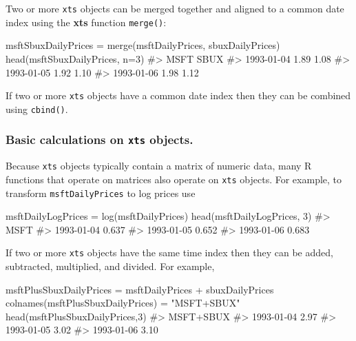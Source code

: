 \documentclass[
  letterpaper,
  DIV=11,
  numbers=noendperiod]{scrreprt}
\newenvironment{Shaded}{\begin{snugshade}}{\end{snugshade}}
\newcommand{\AttributeTok}[1]{\textcolor[rgb]{0.40,0.45,0.13}{#1}}
\newcommand{\CommentTok}[1]{\textcolor[rgb]{0.37,0.37,0.37}{#1}}
\newcommand{\DecValTok}[1]{\textcolor[rgb]{0.68,0.00,0.00}{#1}}
\newcommand{\FunctionTok}[1]{\textcolor[rgb]{0.28,0.35,0.67}{#1}}
\newcommand{\NormalTok}[1]{\textcolor[rgb]{0.00,0.23,0.31}{#1}}
\newcommand{\OtherTok}[1]{\textcolor[rgb]{0.00,0.23,0.31}{#1}}
\newcommand{\SpecialCharTok}[1]{\textcolor[rgb]{0.37,0.37,0.37}{#1}}
\newcommand{\StringTok}[1]{\textcolor[rgb]{0.13,0.47,0.30}{#1}}
\theoremstyle{definition}
\theoremstyle{definition}
\theoremstyle{remark}
\begin{document}
Two or more \texttt{xts} objects can be merged together and aligned to a
common date index using the \textbf{xts} function \texttt{merge()}:

\begin{Shaded}
\begin{Highlighting}[]
\NormalTok{msftSbuxDailyPrices }\OtherTok{=} \FunctionTok{merge}\NormalTok{(msftDailyPrices, sbuxDailyPrices) }
\FunctionTok{head}\NormalTok{(msftSbuxDailyPrices, }\AttributeTok{n=}\DecValTok{3}\NormalTok{)}
\CommentTok{\#\textgreater{}            MSFT SBUX}
\CommentTok{\#\textgreater{} 1993{-}01{-}04 1.89 1.08}
\CommentTok{\#\textgreater{} 1993{-}01{-}05 1.92 1.10}
\CommentTok{\#\textgreater{} 1993{-}01{-}06 1.98 1.12}
\end{Highlighting}
\end{Shaded}

If two or more \texttt{xts} objects have a common date index then they
can be combined using \texttt{cbind()}.

\hypertarget{basic-calculations-on-xts-objects.}{%
\subsubsection{\texorpdfstring{Basic calculations on \texttt{xts}
objects.}{Basic calculations on xts objects.}}\label{basic-calculations-on-xts-objects.}}

Because \texttt{xts} objects typically contain a matrix of numeric data,
many R functions that operate on matrices also operate on \texttt{xts}
objects. For example, to transform \texttt{msftDailyPrices} to log
prices use

\begin{Shaded}
\begin{Highlighting}[]
\NormalTok{msftDailyLogPrices }\OtherTok{=} \FunctionTok{log}\NormalTok{(msftDailyPrices)}
\FunctionTok{head}\NormalTok{(msftDailyLogPrices, }\DecValTok{3}\NormalTok{)}
\CommentTok{\#\textgreater{}             MSFT}
\CommentTok{\#\textgreater{} 1993{-}01{-}04 0.637}
\CommentTok{\#\textgreater{} 1993{-}01{-}05 0.652}
\CommentTok{\#\textgreater{} 1993{-}01{-}06 0.683}
\end{Highlighting}
\end{Shaded}

If two or more \texttt{xts} objects have the same time index then they
can be added, subtracted, multiplied, and divided. For example,

\begin{Shaded}
\begin{Highlighting}[]
\NormalTok{msftPlusSbuxDailyPrices }\OtherTok{=}\NormalTok{ msftDailyPrices }\SpecialCharTok{+}\NormalTok{ sbuxDailyPrices}
\FunctionTok{colnames}\NormalTok{(msftPlusSbuxDailyPrices) }\OtherTok{=} \StringTok{"MSFT+SBUX"}
\FunctionTok{head}\NormalTok{(msftPlusSbuxDailyPrices,}\DecValTok{3}\NormalTok{)}
\CommentTok{\#\textgreater{}            MSFT+SBUX}
\CommentTok{\#\textgreater{} 1993{-}01{-}04      2.97}
\CommentTok{\#\textgreater{} 1993{-}01{-}05      3.02}
\CommentTok{\#\textgreater{} 1993{-}01{-}06      3.10}
\end{Highlighting}
\end{Shaded}
\end{document}
